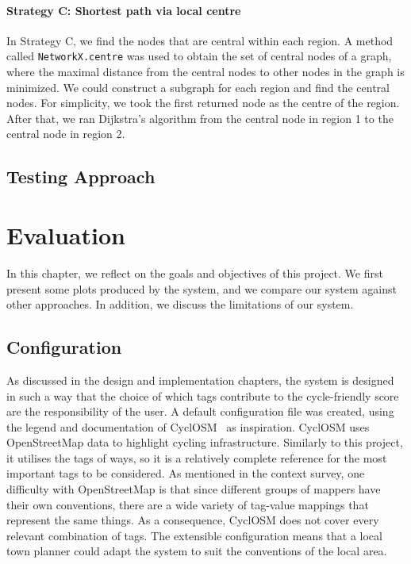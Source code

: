 \documentclass[12pt,a4paper]{report}
\begin{document}
\subsubsection*{Strategy C: Shortest path via local centre}
In Strategy C, we find the nodes that are central within each region. A method called \texttt{NetworkX.centre} was used to obtain the set of central nodes of a graph, where the maximal distance from the central nodes to other nodes in the graph is minimized. We could construct a subgraph for each region and find the central nodes. For simplicity, we took the first returned node as the centre of the region. After that, we ran Dijkstra's algorithm from the central node in region 1 to the central node in region 2.

\section{Testing Approach}

\chapter{Evaluation}\label{chapter:eval}
In this chapter, we reflect on the goals and objectives of this project. We first present some plots produced by the system, and we compare our system against other approaches. In addition, we discuss the limitations of our system.

\section{Configuration}
As discussed in the design and implementation chapters, the system is designed in such a way that the choice of which tags contribute to the cycle-friendly score are the responsibility of the user. A default configuration file was created, using the legend and documentation of CyclOSM~\cite{cycleOSM} as inspiration. CyclOSM uses OpenStreetMap data to highlight cycling infrastructure. Similarly to this project, it utilises the tags of ways, so it is a relatively complete reference for the most important tags to be considered. As mentioned in the context survey, one difficulty with OpenStreetMap is that since different groups of mappers have their own conventions, there are a wide variety of tag-value mappings that represent the same things. As a consequence, CyclOSM does not cover every relevant combination of tags. The extensible configuration means that a local town planner could adapt the system to suit the conventions of the local area.
\end{document}

